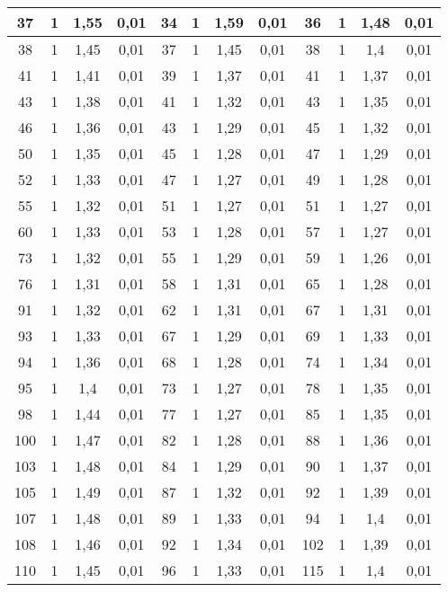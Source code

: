 \begin{tabular}{|*{12}{c|}}
\hline 
37 & 1 & 1,55 & 0,01 & 34 & 1 & 1,59 & 0,01 & 36 & 1 & 1,48 & 0,01 \\ \hline 
 38 & 1 & 1,45 & 0,01 & 37 & 1 & 1,45 & 0,01 & 38 & 1 & 1,4 & 0,01 \\ \hline 
 41 & 1 & 1,41 & 0,01 & 39 & 1 & 1,37 & 0,01 & 41 & 1 & 1,37 & 0,01 \\ \hline 
 43 & 1 & 1,38 & 0,01 & 41 & 1 & 1,32 & 0,01 & 43 & 1 & 1,35 & 0,01 \\ \hline 
 46 & 1 & 1,36 & 0,01 & 43 & 1 & 1,29 & 0,01 & 45 & 1 & 1,32 & 0,01 \\ \hline 
 50 & 1 & 1,35 & 0,01 & 45 & 1 & 1,28 & 0,01 & 47 & 1 & 1,29 & 0,01 \\ \hline 
 52 & 1 & 1,33 & 0,01 & 47 & 1 & 1,27 & 0,01 & 49 & 1 & 1,28 & 0,01 \\ \hline 
 55 & 1 & 1,32 & 0,01 & 51 & 1 & 1,27 & 0,01 & 51 & 1 & 1,27 & 0,01 \\ \hline 
 60 & 1 & 1,33 & 0,01 & 53 & 1 & 1,28 & 0,01 & 57 & 1 & 1,27 & 0,01 \\ \hline 
 73 & 1 & 1,32 & 0,01 & 55 & 1 & 1,29 & 0,01 & 59 & 1 & 1,26 & 0,01 \\ \hline 
 76 & 1 & 1,31 & 0,01 & 58 & 1 & 1,31 & 0,01 & 65 & 1 & 1,28 & 0,01 \\ \hline 
 91 & 1 & 1,32 & 0,01 & 62 & 1 & 1,31 & 0,01 & 67 & 1 & 1,31 & 0,01 \\ \hline 
 93 & 1 & 1,33 & 0,01 & 67 & 1 & 1,29 & 0,01 & 69 & 1 & 1,33 & 0,01 \\ \hline 
 94 & 1 & 1,36 & 0,01 & 68 & 1 & 1,28 & 0,01 & 74 & 1 & 1,34 & 0,01 \\ \hline 
 95 & 1 & 1,4 & 0,01 & 73 & 1 & 1,27 & 0,01 & 78 & 1 & 1,35 & 0,01 \\ \hline 
 98 & 1 & 1,44 & 0,01 & 77 & 1 & 1,27 & 0,01 & 85 & 1 & 1,35 & 0,01 \\ \hline 
 100 & 1 & 1,47 & 0,01 & 82 & 1 & 1,28 & 0,01 & 88 & 1 & 1,36 & 0,01 \\ \hline 
 103 & 1 & 1,48 & 0,01 & 84 & 1 & 1,29 & 0,01 & 90 & 1 & 1,37 & 0,01 \\ \hline 
 105 & 1 & 1,49 & 0,01 & 87 & 1 & 1,32 & 0,01 & 92 & 1 & 1,39 & 0,01 \\ \hline 
 107 & 1 & 1,48 & 0,01 & 89 & 1 & 1,33 & 0,01 & 94 & 1 & 1,4 & 0,01 \\ \hline 
 108 & 1 & 1,46 & 0,01 & 92 & 1 & 1,34 & 0,01 & 102 & 1 & 1,39 & 0,01 \\ \hline 
 110 & 1 & 1,45 & 0,01 & 96 & 1 & 1,33 & 0,01 & 115 & 1 & 1,4 & 0,01 \\ \hline 

\end{tabular}
